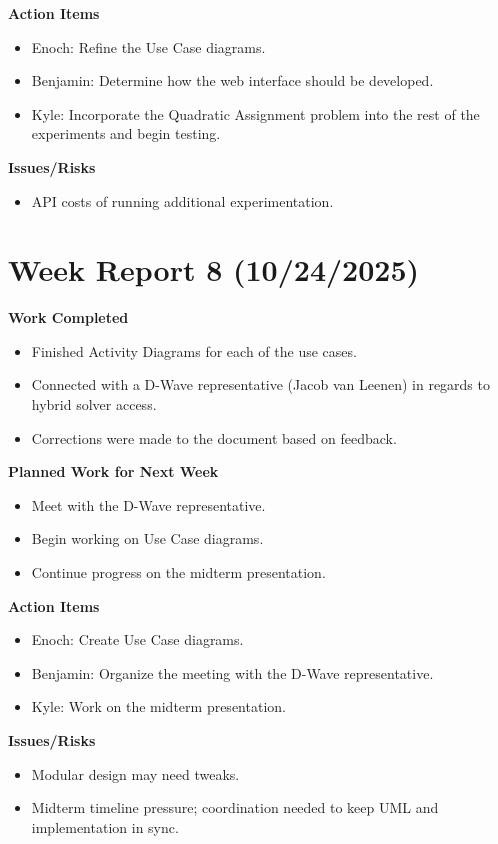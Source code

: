 \textbf{Action Items}
\begin{itemize}
    \item Enoch: Refine the Use Case diagrams.
    \item Benjamin: Determine how the web interface should be developed.
    \item Kyle: Incorporate the Quadratic Assignment problem into the rest of the experiments and begin testing.
\end{itemize}

\textbf{Issues/Risks}
\begin{itemize}
    \item API costs of running additional experimentation.
\end{itemize}

\section{Week Report 8 (10/24/2025)}
\label{sec::W8}

\textbf{Work Completed}
\begin{itemize}
  \item Finished Activity Diagrams for each of the use cases.
  \item Connected with a D-Wave representative (Jacob van Leenen) in regards to hybrid solver access.
  \item Corrections were made to the document based on feedback.
\end{itemize}

\textbf{Planned Work for Next Week}
\begin{itemize}
  \item Meet with the D-Wave representative.
  \item Begin working on Use Case diagrams.
  \item Continue progress on the midterm presentation.
\end{itemize}

\textbf{Action Items}
\begin{itemize}
  \item Enoch: Create Use Case diagrams.
  \item Benjamin: Organize the meeting with the D-Wave representative.
  \item Kyle: Work on the midterm presentation.
\end{itemize}

\textbf{Issues/Risks}
\begin{itemize}
  \item Modular design may need tweaks.
  \item Midterm timeline pressure; coordination needed to keep UML and implementation in sync.
\end{itemize}

